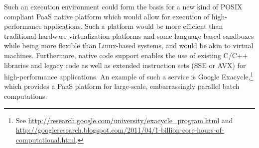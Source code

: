 


Such an execution environment could form the basis for a new kind of
POSIX compliant PaaS native platform which would allow for execution of
high-performance applications. Such a platform would be more efficient
than traditional hardware virtualization platforms and some language
based sandboxes while being more flexible than Linux-based systems, and
would be akin to virtual machines.  Furthermore, native code support
enables the use of existing C/C++ libraries and legacy code as well as
extended instruction sets (\eg SSE or AVX) for high-performance
applications. An example of such a service is Google
Exacycle,\footnote{See
\url{http://research.google.com/university/exacycle_program.html} and
\url{http://googleresearch.blogspot.com/2011/04/1-billion-core-hours-of-computational.html}.}
which provides a PaaS platform for large-scale, embarrassingly parallel
batch computations.

